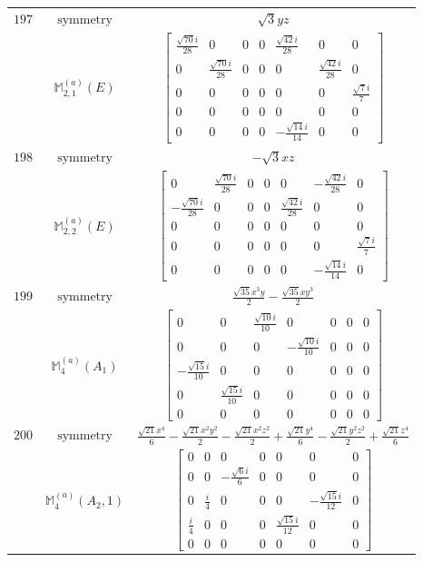 \documentclass[fleqn,8pt,landscape]{jsarticle}
\begin{document}
\begin{longtable}{ccc}
$ 197 $ & $ \text{symmetry} $ & $ \sqrt{3} y z $ \\
$  $ & $ \mathbb{M}_{2,1}^{(a)}(E) $ & $ \begin{bmatrix} \frac{\sqrt{70} i}{28} & 0 & 0 & 0 & \frac{\sqrt{42} i}{28} & 0 & 0 \\ 0 & \frac{\sqrt{70} i}{28} & 0 & 0 & 0 & \frac{\sqrt{42} i}{28} & 0 \\ 0 & 0 & 0 & 0 & 0 & 0 & \frac{\sqrt{7} i}{7} \\ 0 & 0 & 0 & 0 & 0 & 0 & 0 \\ 0 & 0 & 0 & 0 & - \frac{\sqrt{14} i}{14} & 0 & 0 \end{bmatrix} $ \\ \hline
$ 198 $ & $ \text{symmetry} $ & $ - \sqrt{3} x z $ \\
$  $ & $ \mathbb{M}_{2,2}^{(a)}(E) $ & $ \begin{bmatrix} 0 & \frac{\sqrt{70} i}{28} & 0 & 0 & 0 & - \frac{\sqrt{42} i}{28} & 0 \\ - \frac{\sqrt{70} i}{28} & 0 & 0 & 0 & \frac{\sqrt{42} i}{28} & 0 & 0 \\ 0 & 0 & 0 & 0 & 0 & 0 & 0 \\ 0 & 0 & 0 & 0 & 0 & 0 & \frac{\sqrt{7} i}{7} \\ 0 & 0 & 0 & 0 & 0 & - \frac{\sqrt{14} i}{14} & 0 \end{bmatrix} $ \\ \hline
$ 199 $ & $ \text{symmetry} $ & $ \frac{\sqrt{35} x^{3} y}{2} - \frac{\sqrt{35} x y^{3}}{2} $ \\
$  $ & $ \mathbb{M}_{4}^{(a)}(A_{1}) $ & $ \begin{bmatrix} 0 & 0 & \frac{\sqrt{10} i}{10} & 0 & 0 & 0 & 0 \\ 0 & 0 & 0 & - \frac{\sqrt{10} i}{10} & 0 & 0 & 0 \\ - \frac{\sqrt{15} i}{10} & 0 & 0 & 0 & 0 & 0 & 0 \\ 0 & \frac{\sqrt{15} i}{10} & 0 & 0 & 0 & 0 & 0 \\ 0 & 0 & 0 & 0 & 0 & 0 & 0 \end{bmatrix} $ \\ \hline
$ 200 $ & $ \text{symmetry} $ & $ \frac{\sqrt{21} x^{4}}{6} - \frac{\sqrt{21} x^{2} y^{2}}{2} - \frac{\sqrt{21} x^{2} z^{2}}{2} + \frac{\sqrt{21} y^{4}}{6} - \frac{\sqrt{21} y^{2} z^{2}}{2} + \frac{\sqrt{21} z^{4}}{6} $ \\
$  $ & $ \mathbb{M}_{4}^{(a)}(A_{2},1) $ & $ \begin{bmatrix} 0 & 0 & 0 & 0 & 0 & 0 & 0 \\ 0 & 0 & - \frac{\sqrt{6} i}{6} & 0 & 0 & 0 & 0 \\ 0 & \frac{i}{4} & 0 & 0 & 0 & - \frac{\sqrt{15} i}{12} & 0 \\ \frac{i}{4} & 0 & 0 & 0 & \frac{\sqrt{15} i}{12} & 0 & 0 \\ 0 & 0 & 0 & 0 & 0 & 0 & 0 \end{bmatrix} $ \\ \hline

\end{longtable}
\end{document}
